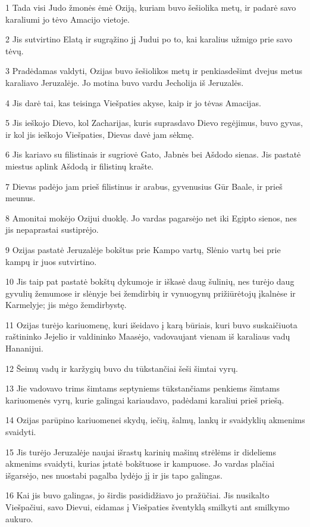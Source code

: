 \par 1 Tada visi Judo žmonės ėmė Oziją, kuriam buvo šešiolika metų, ir padarė savo karaliumi jo tėvo Amacijo vietoje. 
\par 2 Jis sutvirtino Elatą ir sugrąžino jį Judui po to, kai karalius užmigo prie savo tėvų. 
\par 3 Pradėdamas valdyti, Ozijas buvo šešiolikos metų ir penkiasdešimt dvejus metus karaliavo Jeruzalėje. Jo motina buvo vardu Jecholija iš Jeruzalės. 
\par 4 Jis darė tai, kas teisinga Viešpaties akyse, kaip ir jo tėvas Amacijas. 
\par 5 Jis ieškojo Dievo, kol Zacharijas, kuris suprasdavo Dievo regėjimus, buvo gyvas, ir kol jis ieškojo Viešpaties, Dievas davė jam sėkmę. 
\par 6 Jis kariavo su filistinais ir sugriovė Gato, Jabnės bei Ašdodo sienas. Jis pastatė miestus aplink Ašdodą ir filistinų krašte. 
\par 7 Dievas padėjo jam prieš filistinus ir arabus, gyvenusius Gūr Baale, ir prieš meunus. 
\par 8 Amonitai mokėjo Ozijui duoklę. Jo vardas pagarsėjo net iki Egipto sienos, nes jis nepaprastai sustiprėjo. 
\par 9 Ozijas pastatė Jeruzalėje bokštus prie Kampo vartų, Slėnio vartų bei prie kampų ir juos sutvirtino. 
\par 10 Jis taip pat pastatė bokštų dykumoje ir iškasė daug šulinių, nes turėjo daug gyvulių žemumose ir slėnyje bei žemdirbių ir vynuogynų prižiūrėtojų įkalnėse ir Karmelyje; jis mėgo žemdirbystę. 
\par 11 Ozijas turėjo kariuomenę, kuri išeidavo į karą būriais, kuri buvo suskaičiuota raštininko Jejelio ir valdininko Maasėjo, vadovaujant vienam iš karaliaus vadų Hananijui. 
\par 12 Šeimų vadų ir karžygių buvo du tūkstančiai šeši šimtai vyrų. 
\par 13 Jie vadovavo trims šimtams septyniems tūkstančiams penkiems šimtams kariuomenės vyrų, kurie galingai kariaudavo, padėdami karaliui prieš priešą. 
\par 14 Ozijas parūpino kariuomenei skydų, iečių, šalmų, lankų ir svaidyklių akmenims svaidyti. 
\par 15 Jis turėjo Jeruzalėje naujai išrastų karinių mašinų strėlėms ir dideliems akmenims svaidyti, kurias įstatė bokštuose ir kampuose. Jo vardas plačiai išgarsėjo, nes nuostabi pagalba lydėjo jį ir jis tapo galingas. 
\par 16 Kai jis buvo galingas, jo širdis pasididžiavo jo pražūčiai. Jis nusikalto Viešpačiui, savo Dievui, eidamas į Viešpaties šventyklą smilkyti ant smilkymo aukuro. 
